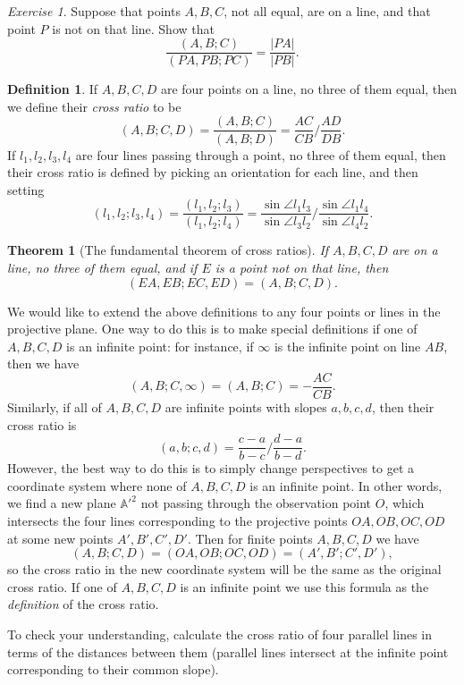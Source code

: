 \documentclass[letterpaper,11pt]{article}
\newtheorem{thm}{Theorem}
\theoremstyle{definition}
\newtheorem{defn}{Definition}
\theoremstyle{remark}
\newtheorem{exer}{Exercise}
\begin{document}
\begin{exer}
Suppose that points $A,B,C$, not all equal, are on a line, and that point $P$ is not on that line. Show that
\[
\frac{(A,B;C)}{(PA,PB;PC)} = \frac{|PA|}{|PB|}.
\]
\end{exer}

\begin{defn} If $A,B,C,D$ are four points on a line, no three of them equal, then we define their \emph{cross ratio} to be
\[
(A,B;C,D) = \frac{(A,B;C)}{(A,B;D)} = \frac{AC}{CB}\bigg/\frac{AD}{DB}.
\]
If $l_1,l_2,l_3,l_4$ are four lines passing through a point, no three of them equal, then their cross ratio is defined by picking an orientation for each line, and then setting
\[
(l_1,l_2;l_3,l_4) = \frac{(l_1,l_2;l_3)}{(l_1,l_2;l_4)} = \frac{\sin\angle l_1l_3}{\sin \angle l_3l_2}\bigg/\frac{\sin\angle l_1l_4}{\sin\angle l_4l_2}.
\]
\end{defn}

\begin{thm}[The fundamental theorem of cross ratios] If $A,B,C,D$ are on a line, no three of them equal, and if $E$ is a point not on that line, then
\[
(EA,EB;EC,ED) = (A,B;C,D).
\]
\end{thm}

We would like to extend the above definitions to any four points or lines in the projective plane. One way to do this is to make special definitions if one of $A,B,C,D$ is an infinite point: for instance, if $\infty$ is the infinite point on line $AB$, then we have
\[
(A,B;C,\infty) = (A,B;C) = -\frac{AC}{CB}.
\]
Similarly, if all of $A,B,C,D$ are infinite points with slopes $a,b,c,d$, then their cross ratio is
\[
(a,b;c,d) = \frac{c-a}{b-c}\bigg/\frac{d-a}{b-d}.
\]
However, the best way to do this is to simply change perspectives to get a coordinate system where none of $A,B,C,D$ is an infinite point. In other words, we find a new plane $\mathbb{A'}^2$ not passing through the observation point $O$, which intersects the four lines corresponding to the projective points $OA,OB,OC,OD$ at some new points $A',B',C',D'$. Then for finite points $A,B,C,D$ we have
\[
(A,B;C,D) = (OA,OB;OC,OD) = (A',B';C',D'),
\]
so the cross ratio in the new coordinate system will be the same as the original cross ratio. If one of $A,B,C,D$ is an infinite point we use this formula as the \emph{definition} of the cross ratio.

To check your understanding, calculate the cross ratio of four parallel lines in terms of the distances between them (parallel lines intersect at the infinite point corresponding to their common slope).
\end{document}
